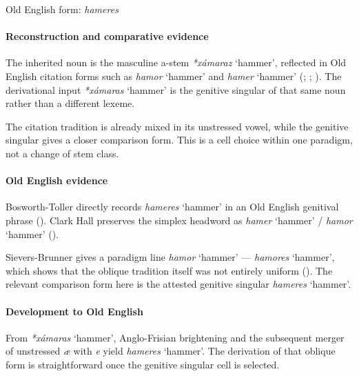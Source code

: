 \documentclass[
  british,
  a4paper,
]{article}
\providecommand{\Recon}[1]{\emph{*#1}}
\begin{document}
Old English form: \emph{hameres}

\paragraph{Reconstruction and comparative
evidence}\label{reconstruction-and-comparative-evidence-123}

The inherited noun is the masculine a-stem \Recon{xámaraz} `hammer',
reflected in Old English citation forms such as {\emph{hamor}} `hammer'
and {\emph{hamer}} `hammer' (; ;
). The derivational
input \Recon{xámaras} `hammer' is the genitive singular of that same
noun rather than a different lexeme.

The citation tradition is already mixed in its unstressed vowel, while
the genitive singular gives a closer comparison form. This is a cell
choice within one paradigm, not a change of stem class.

\paragraph{Old English evidence}\label{old-english-evidence-123}

Bosworth-Toller directly records {\emph{hameres}} `hammer' in an Old
English genitival phrase (). Clark Hall preserves the simplex headword as
{\emph{hamer}} `hammer' / {\emph{hamor}} `hammer'
().

Sievers-Brunner gives a paradigm line {\emph{hamor}} `hammer' ---
{\emph{hamores}} `hammer', which shows that the oblique tradition itself
was not entirely uniform (). The relevant comparison form here is the attested
genitive singular {\emph{hameres}} `hammer'.

\paragraph{Development to Old
English}\label{development-to-old-english-123}

From \Recon{xámaras} `hammer', Anglo-Frisian brightening and the
subsequent merger of unstressed \emph{æ} with \emph{e} yield
{\emph{hameres}} `hammer'. The derivation of that oblique form is
straightforward once the genitive singular cell is selected.
\end{document}
